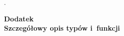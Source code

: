\documentclass[12pt,a4paper,twoside]{article}
\begin{document}
 
\begin{filecontents}{bibliografia.bib}

}
\end{filecontents}


\cite{id:Cormen2001Wprowadzenie}.




 
\cleardoublepage

\rule{0cm}{0cm}

\vfill

\begin{center}
\Huge\bfseries Dodatek\\Szczegółowy opis typów i~funkcji\par
\end{center}

\vfill 

\rule{0cm}{0cm}
\end{document}
